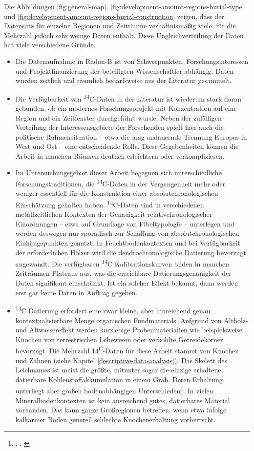 \documentclass[openany,twoside,twocolumn]{book}
\providecommand{\tightlist}{%
  \setlength{\itemsep}{0pt}\setlength{\parskip}{0pt}}
\let\rmarkdownfootnote\footnote%
\def\footnote{\protect\rmarkdownfootnote}
\begin{document}
Die Abbildungen \ref{fig:general-map}, \ref{fig:development-amount-regions-burial-type} und \ref{fig:development-amount-regions-burial-construction} zeigen, dass der Datensatz für einzelne Regionen und Zeiträume verhältnismäßig viele, für die Mehrzahl jedoch sehr wenige Daten enthält. Diese Ungleichverteilung der Daten hat viele verschiedene Gründe.

\begin{itemize}
\tightlist
\item
  Die Datenaufnahme in Radon-B ist von Schwerpunkten, Forschungsinteressen und Projektfinanzierung der beteiligten Wissenschaftler abhängig. Daten wurden zeitlich und räumlich bedarfsweise aus der Literatur gesammelt.
\item
  Die Verfügbarkeit von \textsuperscript{14}C-Daten in der Literatur ist wiederum stark daran gebunden, ob ein modernes Forschungsprojekt mit Konzentration auf eine Region und ein Zeitfenster durchgeführt wurde. Neben der zufälligen Verteilung der Interessensgebiete der Forschenden spielt hier auch die politische Rahmensituation -- etwa die lang andauernde Trennung Europas in West und Ost -- eine entscheidende Rolle. Diese Gegebenheiten können die Arbeit in manchen Räumen deutlich erleichtern oder verkomplizieren.
\item
  Im Untersuchungsgebiet dieser Arbeit begegnen sich unterschiedliche Forschungstraditionen, die \textsuperscript{14}C-Daten in der Vergangenheit mehr oder weniger essentiell für die Konstruktion einer absolutchronologischen Einschätzung gehalten haben. \textsuperscript{14}C-Daten sind in verschiedenen metallzeitlichen Kontexten der Genauigkeit relativchronologischer Einordnungen -- etwa auf Grundlage von Fibeltypologie -- unterlegen und werden deswegen nur sporadisch zur Schaffung von absolutchronologischen Einhängepunkten genutzt. In Feuchtbodenkontexten und bei Verfügbarkeit der erforderlichen Hölzer wird die dendrochronologische Datierung bevorzugt angewandt. Die verfügbaren \textsuperscript{14}C Kalibrationskurven bilden in manchen Zeiträumen Plateaus aus, was die erreichbare Datierungsgenauigkeit der Daten signifikant einschränkt. Ist ein solcher Effekt bekannt, dann werden erst gar keine Daten in Auftrag gegeben.
\item
  \textsuperscript{14}C Datierung erfordert eine zwar kleine, aber hinreichend genau kontextualisierbare Menge organischen Fundmaterials. Aufgrund von Altholz- und Altwassereffekt werden kurzlebige Probenmaterialien wie beispielsweise Knochen von terrestrischen Lebewesen oder verkohlte Getreidekörner bevorzugt. Die Mehrzahl 14\textsuperscript{C}-Daten für diese Arbeit stammt von Knochen und Zähnen (siehe Kapitel \ref{descriptive-data-analysis}). Das Skelett des Leichnames ist meist die größte, mitunter sogar die einzige erhaltene, datierbare Kohlenstoffakkumulation in einem Grab. Deren Erhaltung unterliegt aber großen bodenabhängigen Unterschieden\footnote{\textcite{brock_pre-screening_2010}; \textcite{gordon_soil_1981}; \textcite{nielsen-marsh_bone_2007}}. In vielen Mineralbodenkontexten ist kein ausreichend gutes, datierbares Material vorhanden. Das kann ganze Großregionen betreffen, wenn etwa infolge kalkarmer Böden generell schlechte Knochenerhaltung vorherrscht.

\end{itemize}
\end{document}
